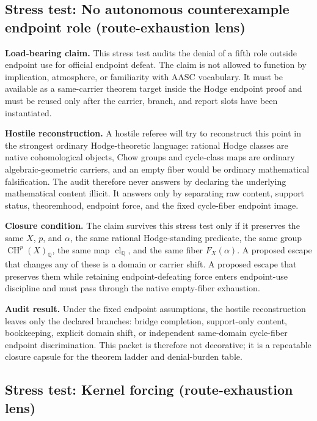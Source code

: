 \documentclass[11pt]{article}
\newcommand{\QQ}{\mathbb{Q}}
\newcommand{\CH}{\operatorname{CH}}
\newcommand{\clQ}{\operatorname{cl}_{\QQ}}
\begin{document}
\subsection{Stress test: No autonomous counterexample endpoint role (route-exhaustion lens)}

\par\noindent\textbf{Load-bearing claim.} This stress test audits the denial of a fifth role outside endpoint use for official endpoint defeat. The claim is not allowed to function by implication, atmosphere, or familiarity with AASC vocabulary. It must be available as a same-carrier theorem target inside the Hodge endpoint proof and must be reused only after the carrier, branch, and report slots have been instantiated.

\par\noindent\textbf{Hostile reconstruction.} A hostile referee will try to reconstruct this point in the strongest ordinary Hodge-theoretic language: rational Hodge classes are native cohomological objects, Chow groups and cycle-class maps are ordinary algebraic-geometric carriers, and an empty fiber would be ordinary mathematical falsification. The audit therefore never answers by declaring the underlying mathematical content illicit. It answers only by separating raw content, support status, theoremhood, endpoint force, and the fixed cycle-fiber endpoint image.

\par\noindent\textbf{Closure condition.} The claim survives this stress test only if it preserves the same $X$, $p$, and $\alpha$, the same rational Hodge-standing predicate, the same group $\CH^p(X)_\QQ$, the same map $\clQ$, and the same fiber $F_X(\alpha)$. A proposed escape that changes any of these is a domain or carrier shift. A proposed escape that preserves them while retaining endpoint-defeating force enters endpoint-use discipline and must pass through the native empty-fiber exhaustion.

\par\noindent\textbf{Audit result.} Under the fixed endpoint assumptions, the hostile reconstruction leaves only the declared branches: bridge completion, support-only content, bookkeeping, explicit domain shift, or independent same-domain cycle-fiber endpoint discrimination. This packet is therefore not decorative; it is a repeatable closure capsule for the theorem ladder and denial-burden table.


\subsection{Stress test: Kernel forcing (route-exhaustion lens)}
\end{document}
